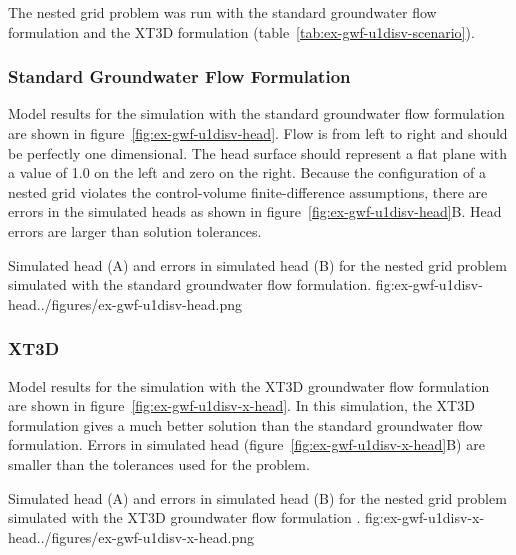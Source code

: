 The nested grid problem was run with the standard groundwater flow formulation and the XT3D formulation \citep{modflow6xt3d} (table~\ref{tab:ex-gwf-u1disv-scenario}). 



\subsubsection{Standard Groundwater Flow Formulation}

Model results for the simulation with the standard groundwater flow formulation are shown in figure~\ref{fig:ex-gwf-u1disv-head}.  Flow is from left to right and should be perfectly one dimensional.  The head surface should represent a flat plane with a value of 1.0 on the left and zero on the right.  Because the configuration of a nested grid violates the control-volume finite-difference assumptions, there are errors in the simulated heads as shown in figure~\ref{fig:ex-gwf-u1disv-head}B.  Head errors are larger than solution tolerances.

\begin{StandardFigure}{
                                     Simulated head (A) and errors in simulated head (B) for the nested grid problem simulated with the standard groundwater flow formulation.
                                     }{fig:ex-gwf-u1disv-head}{../figures/ex-gwf-u1disv-head.png}
\end{StandardFigure}                                 

\subsubsection{XT3D}

Model results for the simulation with the XT3D groundwater flow formulation \citep{modflow6xt3d} are shown in figure~\ref{fig:ex-gwf-u1disv-x-head}.  In this simulation, the XT3D formulation gives a much better solution than the standard groundwater flow formulation.  Errors in simulated head (figure~\ref{fig:ex-gwf-u1disv-x-head}B) are smaller than the tolerances used for the problem.  

\begin{StandardFigure}{
                                     Simulated head (A) and errors in simulated head (B) for the nested grid problem simulated with the XT3D groundwater flow formulation \citep{modflow6xt3d}.
                                     }{fig:ex-gwf-u1disv-x-head}{../figures/ex-gwf-u1disv-x-head.png}
\end{StandardFigure} 